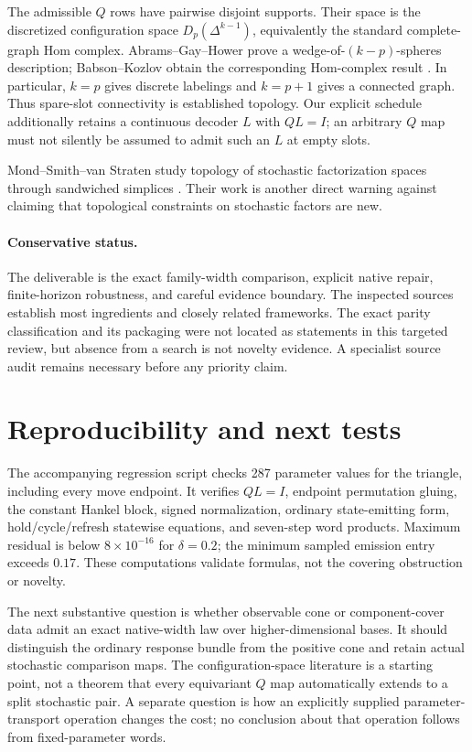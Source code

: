 \documentclass[11pt]{article}
\theoremstyle{definition}\newtheorem{definition}[theorem]{Definition}
\theoremstyle{remark}\newtheorem{remark}[theorem]{Remark}
\begin{document}
The admissible $Q$ rows have pairwise disjoint supports. Their space is the discretized configuration space $D_p(\Delta^{k-1})$, equivalently the standard complete-graph Hom complex. Abrams--Gay--Hower prove a wedge-of-$(k-p)$-spheres description; Babson--Kozlov obtain the corresponding Hom-complex result \cite{AGH,BK}. In particular, $k=p$ gives discrete labelings and $k=p+1$ gives a connected graph. Thus spare-slot connectivity is established topology. Our explicit schedule additionally retains a continuous decoder $L$ with $QL=I$; an arbitrary $Q$ map must not silently be assumed to admit such an $L$ at empty slots.

Mond--Smith--van Straten study topology of stochastic factorization spaces through sandwiched simplices \cite{MSV}. Their work is another direct warning against claiming that topological constraints on stochastic factors are new.

\paragraph{Conservative status.}
The deliverable is the exact family-width comparison, explicit native repair, finite-horizon robustness, and careful evidence boundary. The inspected sources establish most ingredients and closely related frameworks. The exact parity classification and its packaging were not located as statements in this targeted review, but absence from a search is not novelty evidence. A specialist source audit remains necessary before any priority claim.

\section{Reproducibility and next tests}
The accompanying regression script checks 287 parameter values for the triangle, including every move endpoint. It verifies $QL=I$, endpoint permutation gluing, the constant Hankel block, signed normalization, ordinary state-emitting form, hold/cycle/refresh statewise equations, and seven-step word products. Maximum residual is below $8\times10^{-16}$ for $\delta=0.2$; the minimum sampled emission entry exceeds $0.17$. These computations validate formulas, not the covering obstruction or novelty.

The next substantive question is whether observable cone or component-cover data admit an exact native-width law over higher-dimensional bases. It should distinguish the ordinary response bundle from the positive cone and retain actual stochastic comparison maps. The configuration-space literature is a starting point, not a theorem that every equivariant $Q$ map automatically extends to a split stochastic pair. A separate question is how an explicitly supplied parameter-transport operation changes the cost; no conclusion about that operation follows from fixed-parameter words.
\end{document}
